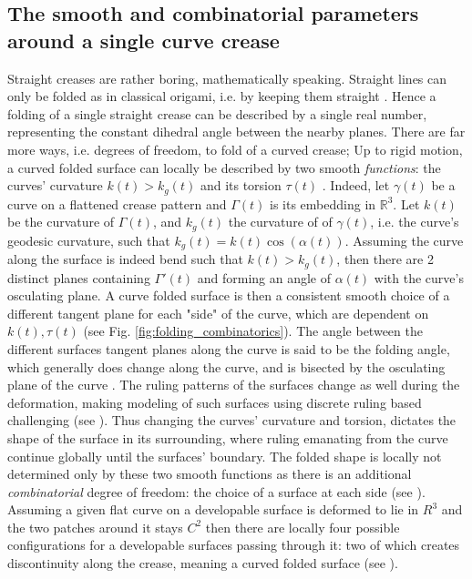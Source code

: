 \subsection{The smooth and combinatorial parameters around a single curve crease}
Straight creases are rather boring, mathematically speaking. Straight lines can only be folded as in classical origami, i.e. by keeping them straight \cite{demaine_lens}. Hence a folding of a single straight crease can be described by a single real number, representing the constant dihedral angle between the nearby planes. There are far more ways, i.e. degrees of freedom, to fold of a curved crease; Up to rigid motion, a curved folded surface can locally be described by two smooth \textit{functions}: the curves' curvature $k(t) > k_g(t)$ and its torsion $\tau(t)$  \cite{more_on_paper, duncan_folded}. Indeed, let $\gamma(t)$ be a curve on a flattened crease pattern and $\Gamma(t)$ is its embedding in $\mathbb{R}^3$. Let $k(t)$ be the curvature of $\Gamma(t)$, and $k_g(t)$ the curvature of of $\gamma(t)$, i.e. the curve's geodesic curvature, such that $k_g(t) = k(t) \cos(\alpha(t))$. Assuming the curve along the surface is indeed bend such that $k(t) > k_g(t)$, then there are 2 distinct planes containing $\Gamma'(t)$ and forming an angle of $\alpha(t)$ with the curve's osculating plane. A curve folded surface is then a consistent smooth choice of a different tangent plane for each "side" of the curve, which are dependent on $k(t),\tau(t)$ (see Fig. \ref{fig:folding_combinatorics}). The angle between the different surfaces tangent planes along the curve is said to be the folding angle, which generally does change along the curve, and is bisected by the osculating plane of the curve \cite{curved_folding_kilian,more_on_paper,duncan_folded}. The ruling patterns of the surfaces change as well during the deformation, making modeling of such surfaces using discrete ruling based challenging  (see ). Thus changing the curves' curvature and torsion, dictates the shape of the surface in its surrounding, where ruling emanating from the curve continue globally until the surfaces' boundary. The folded shape is locally not determined only by these two smooth functions as there is an additional \textit{combinatorial} degree of freedom: the choice of a surface at each side (see ). Assuming a given flat curve on a developable surface is deformed to lie in $R^3$ and the two patches around it stays $C^2$ then there are locally four possible configurations for a developable surfaces passing through it: two of which creates discontinuity along the crease, meaning a curved folded surface (see ). %


